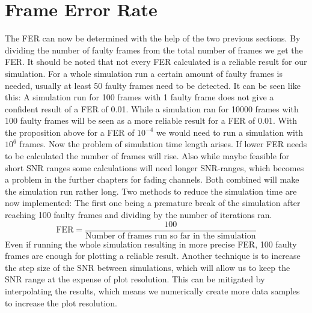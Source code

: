 \section{Frame Error Rate}
\label{sec:FER}
The \gls{FER} can now be determined with the help of the two previous sections. By dividing the number of faulty frames from the total number of frames we get the \gls{FER}. It should be noted that not every \gls{FER} calculated is a reliable result for our simulation. For a whole simulation run a certain amount of faulty frames is needed, usually at least 50 faulty frames need to be detected. It can be seen like this: A simulation run for 100 frames with 1 faulty frame does not give a confident result of a \gls{FER} of 0.01. While a simulation ran for 10000 frames with 100 faulty frames will be seen as a more reliable result for a \gls{FER} of 0.01. 
\newline
With the proposition above for a \gls{FER} of $10^{-4}$ we would need to run a simulation with $10^6$ frames. Now the problem of simulation time length arises. If lower \gls{FER} needs to be calculated the number of frames will rise. Also while maybe feasible for short SNR ranges some calculations will need longer SNR-ranges, which becomes a problem in the further chapters for fading channels. Both combined will make the simulation run rather long.
\newline
Two methods to reduce the simulation time are now implemented: The first one being a premature break of the simulation after reaching 100 faulty frames and dividing by the number of iterations ran.
\begin{equation}
\textrm{FER} = \frac{100}{\textrm{Number of frames run so far in the simulation}}
\end{equation}
Even if running the whole simulation resulting in more precise \gls{FER}, 100 faulty frames are enough for plotting a reliable result. Another technique is to increase the step size of the SNR between simulations, which will allow us to keep the SNR range at the expense of plot resolution. This can be mitigated by interpolating the results, which means we numerically create more data samples to increase the plot resolution.

\newpage
